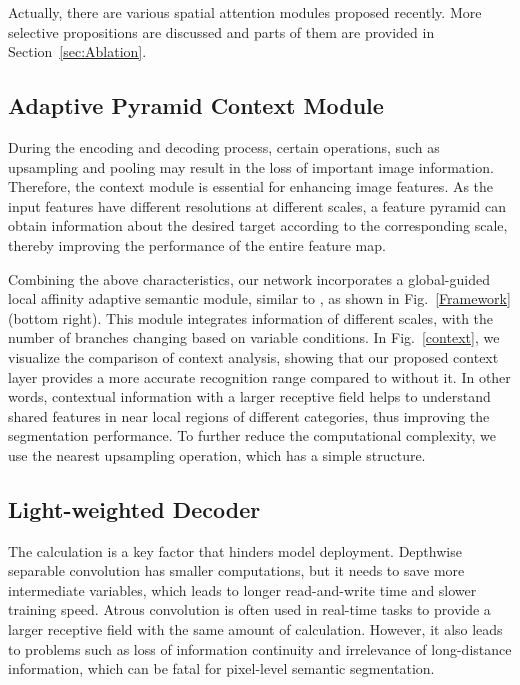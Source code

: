 \documentclass[journal,twoside,web]{ieeecolor}
\begin{document}
Actually, there are various spatial attention modules proposed recently. More selective propositions are discussed and parts of them are provided in Section~\ref{sec:Ablation}.

\subsection{Adaptive Pyramid Context  Module}
During the encoding and decoding process, certain operations, such as upsampling and pooling may result in the loss of important image information. Therefore, the context module is essential for enhancing image features. As the input features have different resolutions at different scales, a feature pyramid can obtain information about the desired target according to the corresponding scale, thereby improving the performance of the entire feature map.

Combining the above characteristics, our network incorporates a global-guided local affinity adaptive semantic module, similar to \cite{APCNet}, as shown in Fig.~\ref{Framework} (bottom right). This module integrates information of different scales, with the number of branches changing based on variable conditions. In Fig.~\ref{context}, we visualize the comparison of context analysis,  showing that our proposed context layer provides a more accurate recognition range compared to without it. In other words, contextual information with a larger receptive field helps to understand shared features in near local regions of different categories, thus improving the segmentation performance. To further reduce the computational complexity, we use the nearest upsampling operation, which has a simple structure.  

\subsection{Light-weighted Decoder}
The calculation is a key factor that hinders model deployment. Depthwise separable convolution has smaller computations, but it needs to save more intermediate variables, which leads to longer read-and-write time and slower training speed. Atrous convolution is often used in real-time tasks to provide a larger receptive field with the same amount of calculation. However, it also leads to problems such as loss of information continuity and irrelevance of long-distance information, which can be fatal for pixel-level semantic segmentation.
\end{document}
